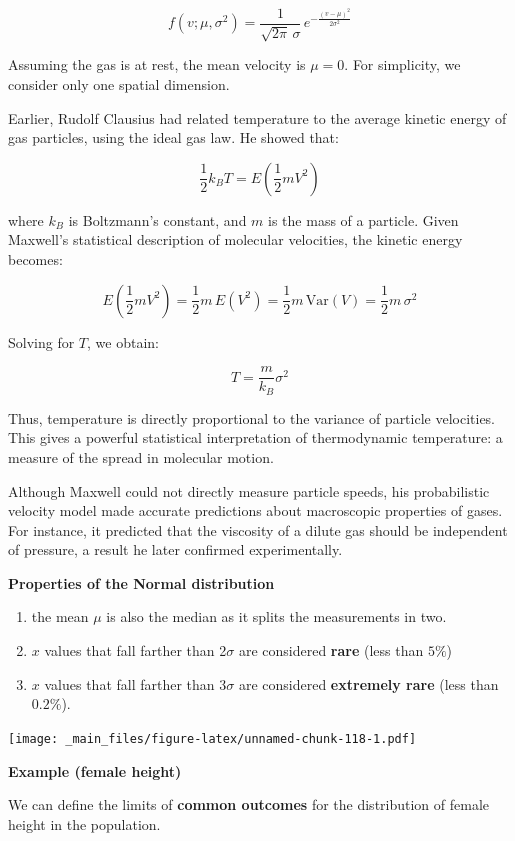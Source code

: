 \documentclass[
]{book}
\begin{document}
\[
f(v; \mu, \sigma^2) = \frac{1}{\sqrt{2\pi} \, \sigma} \, e^{- \frac{(v - \mu)^2}{2\sigma^2}}
\]

Assuming the gas is at rest, the mean velocity is \(\mu = 0\). For simplicity, we consider only one spatial dimension.

Earlier, Rudolf Clausius had related temperature to the average kinetic energy of gas particles, using the ideal gas law. He showed that:

\[
\frac{1}{2} k_B T = E\left(\frac{1}{2} m V^2\right)
\]

where \(k_B\) is Boltzmann's constant, and \(m\) is the mass of a particle. Given Maxwell's statistical description of molecular velocities, the kinetic energy becomes:

\[
E\left(\frac{1}{2} m V^2\right) = \frac{1}{2} m \, E(V^2) = \frac{1}{2} m \, \text{Var}(V) = \frac{1}{2} m \, \sigma^2
\]

Solving for \(T\), we obtain:

\[
T = \frac{m}{k_B} \sigma^2
\]

Thus, temperature is directly proportional to the variance of particle velocities. This gives a powerful statistical interpretation of thermodynamic temperature: a measure of the spread in molecular motion.

Although Maxwell could not directly measure particle speeds, his probabilistic velocity model made accurate predictions about macroscopic properties of gases. For instance, it predicted that the viscosity of a dilute gas should be independent of pressure, a result he later confirmed experimentally.

\textbf{Properties of the Normal distribution}

\begin{enumerate}
\def\labelenumi{\arabic{enumi})}
\item
  the mean \(\mu\) is also the median as it splits the measurements in two.
\item
  \(x\) values that fall farther than 2\(\sigma\) are considered \textbf{rare} (less than \(5\%\))
\item
  \(x\) values that fall farther than 3\(\sigma\) are considered \textbf{extremely rare} (less than \(0.2\%\)).
\end{enumerate}

\texttt{[image: \_main\_files/figure-latex/unnamed-chunk-118-1.pdf]}

\textbf{Example (female height)}

We can define the limits of \textbf{common outcomes} for the distribution of female height in the population.
\end{document}
